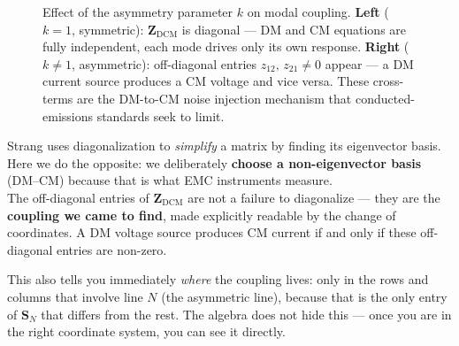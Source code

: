 \begin{figure}[H]
\caption{Effect of the asymmetry parameter $k$ on modal coupling.
\textbf{Left} ($k=1$, symmetric): $\mathbf{Z}_{\mathrm{DCM}}$ is diagonal —
DM and CM equations are fully independent, each mode drives only its
own response.
\textbf{Right} ($k\neq 1$, asymmetric): off-diagonal entries
$z_{12},\,z_{21}\neq 0$ appear — a DM current source produces a CM voltage
and vice versa.
These cross-terms are the DM-to-CM noise injection mechanism that
conducted-emissions standards seek to limit.}
\label{fig:appA_coupling}
\end{figure}

\begin{eqnbox}
Strang uses diagonalization to \emph{simplify} a matrix by finding
its eigenvector basis.  Here we do the opposite: we deliberately
\textbf{choose a non-eigenvector basis} (DM--CM) because that is what
EMC instruments measure.\\[4pt]
The off-diagonal entries of $\mathbf{Z}_{\mathrm{DCM}}$ are not a
failure to diagonalize — they are the \textbf{coupling we came to
find}, made explicitly readable by the change of coordinates.  A DM
voltage source produces CM current if and only if these off-diagonal
entries are non-zero.
\end{eqnbox}

This also tells you immediately \emph{where} the coupling lives: only
in the rows and columns that involve line $N$ (the asymmetric line),
because that is the only entry of $\mathbf{S}_N$ that differs from
the rest.  The algebra does not hide this — once you are in the right
coordinate system, you can see it directly.

